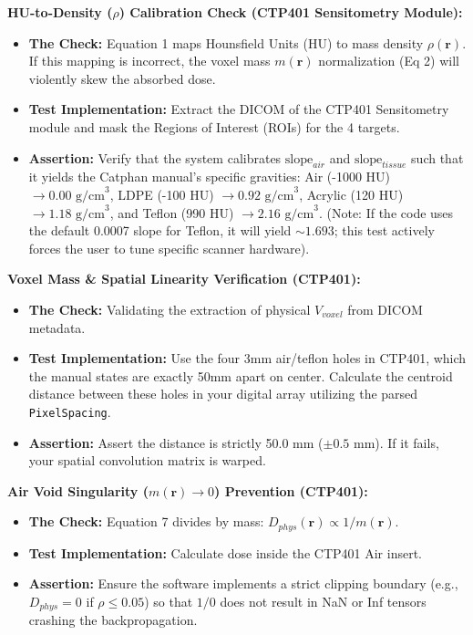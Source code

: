 \documentclass[11pt,a4paper]{article}
\begin{document}
\noindent\textbf{HU-to-Density ($\rho$) Calibration Check (CTP401 Sensitometry Module):}
\begin{itemize}
    \item \textbf{The Check:} Equation 1 maps Hounsfield Units (HU) to mass density $\rho(\mathbf{r})$. If this mapping is incorrect, the voxel mass $m(\mathbf{r})$ normalization (Eq 2) will violently skew the absorbed dose.
    \item \textbf{Test Implementation:} Extract the DICOM of the CTP401 Sensitometry module and mask the Regions of Interest (ROIs) for the 4 targets.
    \item \textbf{Assertion:} Verify that the system calibrates $\text{slope}_{air}$ and $\text{slope}_{tissue}$ such that it yields the Catphan manual's specific gravities: Air (-1000 HU) $\rightarrow 0.00 \text{ g/cm}^3$, LDPE (-100 HU) $\rightarrow 0.92 \text{ g/cm}^3$, Acrylic (120 HU) $\rightarrow 1.18 \text{ g/cm}^3$, and Teflon (990 HU) $\rightarrow 2.16 \text{ g/cm}^3$. (Note: If the code uses the default 0.0007 slope for Teflon, it will yield $\sim 1.693$; this test actively forces the user to tune specific scanner hardware).
\end{itemize}

\noindent\textbf{Voxel Mass \& Spatial Linearity Verification (CTP401):}
\begin{itemize}
    \item \textbf{The Check:} Validating the extraction of physical $V_{voxel}$ from DICOM metadata.
    \item \textbf{Test Implementation:} Use the four 3mm air/teflon holes in CTP401, which the manual states are exactly 50mm apart on center. Calculate the centroid distance between these holes in your digital array utilizing the parsed \texttt{PixelSpacing}.
    \item \textbf{Assertion:} Assert the distance is strictly 50.0 mm ($\pm 0.5$ mm). If it fails, your spatial convolution matrix is warped.
\end{itemize}

\noindent\textbf{Air Void Singularity ($m(\mathbf{r}) \rightarrow 0$) Prevention (CTP401):}
\begin{itemize}
    \item \textbf{The Check:} Equation 7 divides by mass: $D_{phys}(\mathbf{r}) \propto 1/m(\mathbf{r})$.
    \item \textbf{Test Implementation:} Calculate dose inside the CTP401 Air insert.
    \item \textbf{Assertion:} Ensure the software implements a strict clipping boundary (e.g., $D_{phys} = 0$ if $\rho \le 0.05$) so that $1/0$ does not result in NaN or Inf tensors crashing the backpropagation.
\end{itemize}
\end{document}
